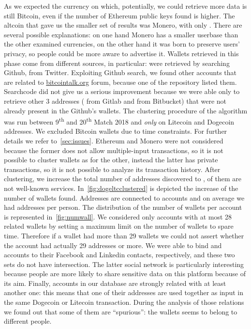 As we expected the currency on which, potentially, we could retrieve more data
is still Bitcoin, even if the number of Ethereum public keys found is higher.
The altcoin that gave us the smaller set of results was Monero, with only
\startingXMR{}. There are several possible explanations: on one hand Monero has
a smaller userbase than the other examined currencies, on the other hand it was
born to preserve users' privacy, so people could be more aware to advertise it.
Wallets retrieved in this phase come from different sources, in particular:
\accountGithub{} were retrieved by searching Github, \accountTwitter{}
from Twitter. Exploiting Github search, we found other \accountBitcointalk{}
accounts that are related to \url{bitcointalk.org} forum, because one
of the repository listed them. Searchcode did not give us a serious improvement
because we were able only to retrieve other 3 addresses (\accountGitlab{} from
Gitlab and \accountBitbucket{} from Bitbucket) that were not already present in
the Github's wallets.
The clustering procedure of the algorithm was run between 9\textsuperscript{th}
and 20\textsuperscript{th} Match 2018 and \emph{only} on Litecoin and Dogecoin
addresses. We excluded Bitcoin wallets due to time constraints.
For further details we refer to~\autoref{sec:issues}. Ethereum and Monero were
not considered because the former does not allow multiple-input transactions,
so it is not possible to cluster wallets as for the other, instead the latter
has private transactions, so it is not possible to analyze its transaction
history. After clustering, we increase the total number of addresses discovered
to \clusteringNumberAllWallets{}, \clusteringNumberWalletsNotService{} of them
are not well-known services.
In~\autoref{fig:dogeltcclustered} is depicted the increase of the number of
wallets found.
Addresses are connected to \accountNumber{} accounts and on average we had
\avarageAccount{} addresses per person.
The distribution of the number of wallets per account is represented
in~\autoref{fig:numwall}. We considered only accounts with at most 28 related
wallets by setting a maximum limit on the number of
wallets to spare time.
Therefore if a wallet had more than 29 wallets we could not assert whether
the account had actually 29 addresses or more.
We were able to bind \facebookRelatedAccounts{} and \linkedinRelatedAccount{}
accounts to their Facebook and Linkedin contacts, respectively, and these two
sets do not have intersection. The latter social network is particularly
interesting because people are more likely to share sensitive data on this
platform because of its aim.
Finally, \accountRelated{} accounts in our database are strongly related with
at least another one: this means that one of their addresses are used together
as input in the same Dogecoin or Litecoin transaction. During the analysis of
those relations we found out that some of them are ``spurious'': the wallets
seems to belong to different people.


